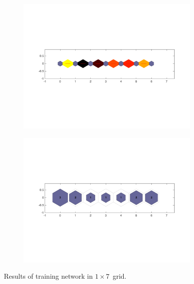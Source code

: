     \begin{figure}
        \begin{subfigure}[b]{0.5\textwidth}
            \centering
            \includegraphics[width=\textwidth]{../images/1d/apps/dist_1_by_7.png}
        \end{subfigure}
        \hfill
        \begin{subfigure}[b]{0.5\textwidth}
             \includegraphics[width=\textwidth]{../images/1d/apps/hit_t_1_by_7.png}
        \end{subfigure}
                \caption{Results of training network in $1\times7$~grid.}
         \label{fig: 1by7T}
    \end{figure}
    
